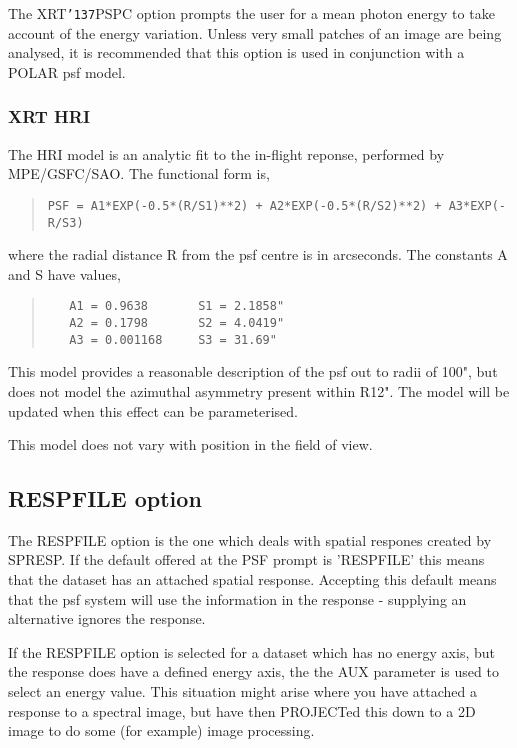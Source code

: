 \documentclass{book}
\renewcommand{\_}{{\tt\char'137}}     %
\begin{document}
The XRT\_PSPC option prompts the user for a mean photon energy
to take account of the energy variation. Unless very small
patches of an image are being analysed, it is recommended that
this option is used in conjunction with a POLAR psf model.
 
\subsubsection{XRT HRI}
The HRI model is an analytic fit to the in-flight reponse,
performed by MPE/GSFC/SAO. The functional form is,
 
\begin{quote}\begin{verbatim}
PSF = A1*EXP(-0.5*(R/S1)**2) + A2*EXP(-0.5*(R/S2)**2) + A3*EXP(-R/S3)
\end{verbatim}\end{quote}
where the radial distance R from the psf centre is in arcseconds.
The constants A and S have values,
\begin{quote}\begin{verbatim}
   A1 = 0.9638       S1 = 2.1858"
   A2 = 0.1798       S2 = 4.0419"
   A3 = 0.001168     S3 = 31.69"
\end{verbatim}\end{quote}
This model provides a reasonable description of the psf out to
radii of 100", but does not model the azimuthal asymmetry
present within R12". The model will be updated when this effect
can be parameterised.
 
This model does not vary with position in the field of view.
 
\subsection{RESPFILE option}
The RESPFILE option is the one which deals with spatial respones
created by SPRESP. If the default offered at the PSF prompt
is 'RESPFILE' this means that the dataset has an attached spatial
response. Accepting this default means that the psf system will
use the information in the response - supplying an alternative
ignores the response.
 
If the RESPFILE option is selected for a dataset which has no
energy axis, but the response does have a defined energy axis,
the the AUX parameter is used to select an energy value. This
situation might arise where you have attached a response to a
spectral image, but have then PROJECTed this down to a 2D
image to do some (for example) image processing.
 
\end{document}
